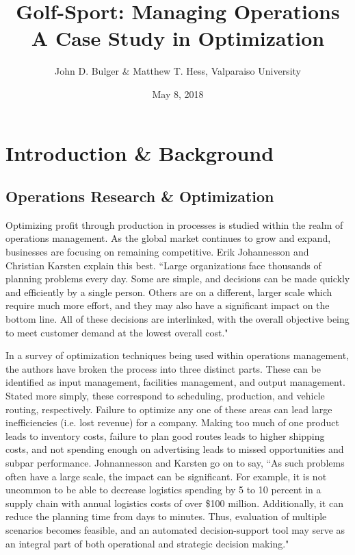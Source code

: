 \documentclass{article}
\title{Golf-Sport:  Managing Operations \\ A Case Study in Optimization}
\date{May 8, 2018}
\author{John D. Bulger \& Matthew T. Hess, Valparaiso University}
\begin{document}
	\maketitle
	\newpage
\section{Introduction \& Background}
\subsection{Operations Research \& Optimization}
Optimizing profit through production in processes is studied within the realm of operations management. As the global market continues to grow and expand, businesses are focusing on remaining competitive. Erik Johannesson and Christian Karsten explain this best. ``Large organizations face thousands of planning problems every day. Some are simple, and decisions can be made quickly and efficiently by a single person. Others are on a different, larger scale which require much more effort, and they may also have a significant impact on the bottom line.  All of these decisions are interlinked, with the overall objective being to meet customer demand at the lowest overall cost."\cite{johan}
\par
In a survey of optimization techniques being used within operations management, the authors have broken the process into three distinct parts. These can be identified as input management, facilities management, and output management. Stated more simply, these correspond to scheduling, production, and vehicle routing, respectively. Failure to optimize any one of these areas can lead large inefficiencies (i.e. lost revenue) for a company. Making too much of one product leads to inventory costs, failure to plan good routes leads to higher shipping costs, and not spending enough on advertising leads to missed opportunities and subpar performance. Johnannesson and Karsten go on to say, ``As such problems often have a large scale, the impact can be significant. For example, it is not uncommon to be able to decrease logistics spending by 5 to 10 percent in a supply chain with annual logistics costs of over \$100 million. 
Additionally, it can reduce the planning time from days to minutes. Thus, evaluation of multiple scenarios becomes feasible, and an automated decision-support tool may serve as an integral part of both operational and strategic decision making."\cite{johan}  
\end{document}
